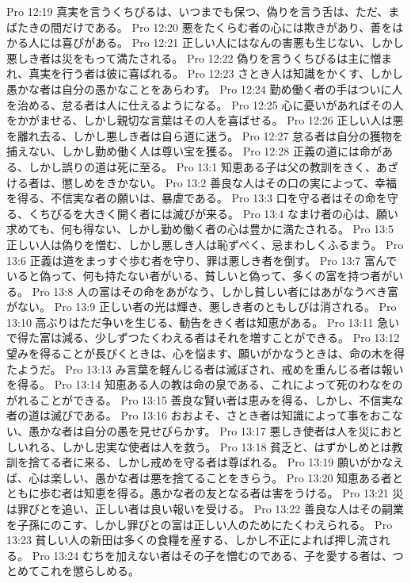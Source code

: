 Pro 12:19  真実を言うくちびるは、いつまでも保つ、偽りを言う舌は、ただ、まばたきの間だけである。
Pro 12:20  悪をたくらむ者の心には欺きがあり、善をはかる人には喜びがある。
Pro 12:21  正しい人にはなんの害悪も生じない、しかし悪しき者は災をもって満たされる。
Pro 12:22  偽りを言うくちびるは主に憎まれ、真実を行う者は彼に喜ばれる。
Pro 12:23  さとき人は知識をかくす、しかし愚かな者は自分の愚かなことをあらわす。
Pro 12:24  勤め働く者の手はついに人を治める、怠る者は人に仕えるようになる。
Pro 12:25  心に憂いがあればその人をかがませる、しかし親切な言葉はその人を喜ばせる。
Pro 12:26  正しい人は悪を離れ去る、しかし悪しき者は自ら道に迷う。
Pro 12:27  怠る者は自分の獲物を捕えない、しかし勤め働く人は尊い宝を獲る。
Pro 12:28  正義の道には命がある、しかし誤りの道は死に至る。
Pro 13:1  知恵ある子は父の教訓をきく、あざける者は、懲しめをきかない。
Pro 13:2  善良な人はその口の実によって、幸福を得る、不信実な者の願いは、暴虐である。
Pro 13:3  口を守る者はその命を守る、くちびるを大きく開く者には滅びが来る。
Pro 13:4  なまけ者の心は、願い求めても、何も得ない、しかし勤め働く者の心は豊かに満たされる。
Pro 13:5  正しい人は偽りを憎む、しかし悪しき人は恥ずべく、忌まわしくふるまう。
Pro 13:6  正義は道をまっすぐ歩む者を守り、罪は悪しき者を倒す。
Pro 13:7  富んでいると偽って、何も持たない者がいる、貧しいと偽って、多くの富を持つ者がいる。
Pro 13:8  人の富はその命をあがなう、しかし貧しい者にはあがなうべき富がない。
Pro 13:9  正しい者の光は輝き、悪しき者のともしびは消される。
Pro 13:10  高ぶりはただ争いを生じる、勧告をきく者は知恵がある。
Pro 13:11  急いで得た富は減る、少しずつたくわえる者はそれを増すことができる。
Pro 13:12  望みを得ることが長びくときは、心を悩ます、願いがかなうときは、命の木を得たようだ。
Pro 13:13  み言葉を軽んじる者は滅ぼされ、戒めを重んじる者は報いを得る。
Pro 13:14  知恵ある人の教は命の泉である、これによって死のわなをのがれることができる。
Pro 13:15  善良な賢い者は恵みを得る、しかし、不信実な者の道は滅びである。
Pro 13:16  おおよそ、さとき者は知識によって事をおこない、愚かな者は自分の愚を見せびらかす。
Pro 13:17  悪しき使者は人を災におとしいれる、しかし忠実な使者は人を救う。
Pro 13:18  貧乏と、はずかしめとは教訓を捨てる者に来る、しかし戒めを守る者は尊ばれる。
Pro 13:19  願いがかなえば、心は楽しい、愚かな者は悪を捨てることをきらう。
Pro 13:20  知恵ある者とともに歩む者は知恵を得る。愚かな者の友となる者は害をうける。
Pro 13:21  災は罪びとを追い、正しい者は良い報いを受ける。
Pro 13:22  善良な人はその嗣業を子孫にのこす、しかし罪びとの富は正しい人のためにたくわえられる。
Pro 13:23  貧しい人の新田は多くの食糧を産する、しかし不正によれば押し流される。
Pro 13:24  むちを加えない者はその子を憎むのである、子を愛する者は、つとめてこれを懲らしめる。
